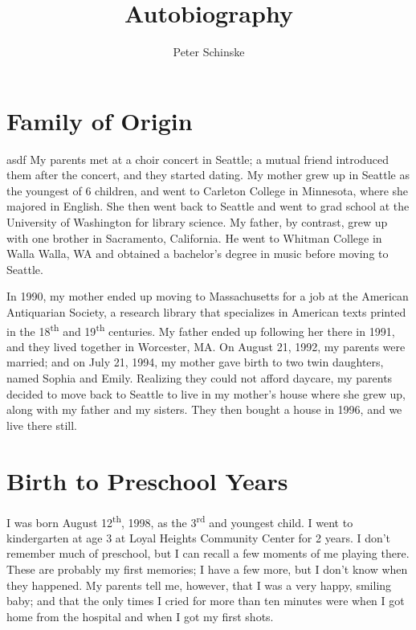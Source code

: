 \documentclass[12pt, letter]{article}
\title{\textbf{Autobiography}}
\author{Peter Schinske}
\date{}
\renewcommand{\ss}[2]{#1\textsuperscript{#2}}
\begin{document}
	\singlespacing
	
	\maketitle
	
	\section*{Family of Origin}
	
	\doublespacing
	asdf	
	My parents met at a choir concert in Seattle; a mutual friend introduced them after the concert, and they started dating. My mother grew up in Seattle as the youngest of 6 children, and went to Carleton College in Minnesota, where she majored in English. She then went back to Seattle and went to grad school at the University of Washington for library science. My father, by contrast, grew up with one brother in Sacramento, California. He went to Whitman College in Walla Walla, WA and obtained a bachelor's degree in music before moving to Seattle.
	
	In 1990, my mother ended up moving to Massachusetts for a job at the American Antiquarian Society, a research library that specializes in American texts printed in the \ss{18}{th} and \ss{19}{th} centuries. My father ended up following her there in 1991, and they lived together in Worcester, MA. On August 21, 1992, my parents were married; and on July 21, 1994, my mother gave birth to two twin daughters, named Sophia and Emily. Realizing they could not afford daycare, my parents decided to move back to Seattle to live in my mother's house where she grew up, along with my father and my sisters. They then bought a house in 1996, and we live there still.
	
	\singlespacing
	\section*{Birth to Preschool Years}
	\doublespacing
	
	I was born August \ss{12}{th}, 1998, as the \ss{3}{rd} and youngest child. I went to kindergarten at age 3 at Loyal Heights Community Center for 2 years. I don't remember much of preschool, but I can recall a few moments of me playing there. These are probably my first memories; I have a few more, but I don't know when they happened. My parents tell me, however, that I was a very happy, smiling baby; and that the only times I cried for more than ten minutes were when I got home from the hospital and when I got my first shots.
	
\end{document}

